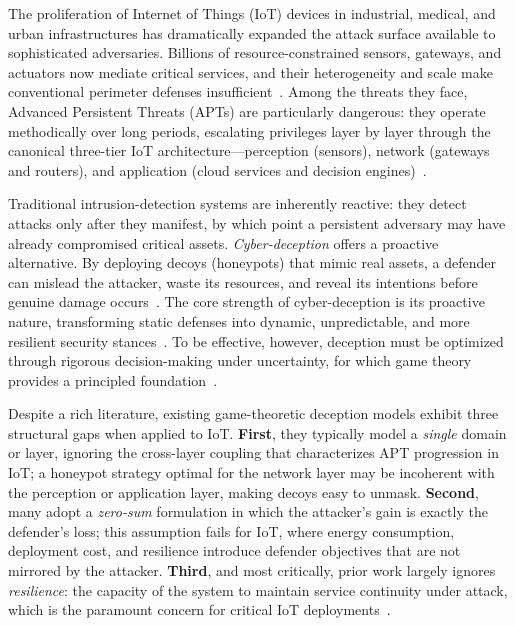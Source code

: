 \documentclass[conference]{IEEEtran}
\begin{document}
The proliferation of Internet of Things (IoT) devices in industrial,
medical, and urban infrastructures has dramatically expanded the attack
surface available to sophisticated adversaries. Billions of resource-constrained
sensors, gateways, and actuators now mediate critical services, and their
heterogeneity and scale make conventional perimeter defenses
insufficient~\cite{pawlick2019}. Among the threats they face, Advanced
Persistent Threats (APTs) are particularly dangerous: they operate methodically
over long periods, escalating privileges layer by layer through the canonical
three-tier IoT architecture---perception (sensors), network (gateways and
routers), and application (cloud services and decision engines)~\cite{wan2022}.

Traditional intrusion-detection systems are inherently reactive: they detect
attacks only after they manifest, by which point a persistent adversary may
have already compromised critical assets. \emph{Cyber-deception} offers a
proactive alternative. By deploying decoys (honeypots) that mimic real assets,
a defender can mislead the attacker, waste its resources, and reveal its
intentions before genuine damage occurs~\cite{anwar2020,sayed2023}. The core
strength of cyber-deception is its proactive nature, transforming static
defenses into dynamic, unpredictable, and more resilient security
stances~\cite{asghar2025}. To be effective, however, deception must be
optimized through rigorous decision-making under uncertainty, for which game
theory provides a principled foundation~\cite{huang2019}.

Despite a rich literature, existing game-theoretic deception models exhibit
three structural gaps when applied to IoT. \textbf{First}, they typically
model a \emph{single} domain or layer, ignoring the cross-layer coupling that
characterizes APT progression in IoT; a honeypot strategy optimal for the
network layer may be incoherent with the perception or application layer,
making decoys easy to unmask. \textbf{Second}, many adopt a \emph{zero-sum}
formulation in which the attacker's gain is exactly the defender's loss; this
assumption fails for IoT, where energy consumption, deployment cost, and
resilience introduce defender objectives that are not mirrored by the attacker.
\textbf{Third}, and most critically, prior work largely ignores
\emph{resilience}: the capacity of the system to maintain service continuity
under attack, which is the paramount concern for critical IoT
deployments~\cite{he2026}.
\end{document}
